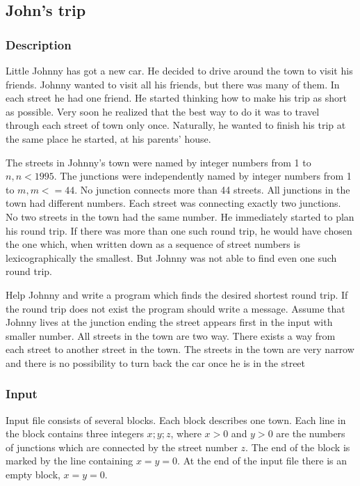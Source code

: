 \subsection{John's trip}


\subsubsection{Description}
Little Johnny has got a new car. He decided to drive around the town to visit his friends. Johnny wanted to visit all his friends, but there was many of them. In each street he had one friend. He started thinking how to make his trip as short as possible. Very soon he realized that the best way to do it was to travel through each street of town only once. Naturally, he wanted to finish his trip at the same place he started, at his parents' house. 

The streets in Johnny's town were named by integer numbers from 1 to $n, n < 1995$. The junctions were independently named by integer numbers from 1 to $m, m <= 44$. No junction connects more than 44 streets. All junctions in the town had different numbers. Each street was connecting exactly two junctions. No two streets in the town had the same number. He immediately started to plan his round trip. If there was more than one such round trip, he would have chosen the one which, when written down as a sequence of street numbers is lexicographically the smallest. But Johnny was not able to find even one such round trip. 

Help Johnny and write a program which finds the desired shortest round trip. If the round trip does not exist the program should write a message. Assume that Johnny lives at the junction ending the street appears first in the input with smaller number. All streets in the town are two way. There exists a way from each street to another street in the town. The streets in the town are very narrow and there is no possibility to turn back the car once he is in the street 


\subsubsection{Input}
Input file consists of several blocks. Each block describes one town. Each line in the block contains three integers $x; y; z$, where $x > 0$ and $y > 0$ are the numbers of junctions which are connected by the street number $z$. The end of the block is marked by the line containing $x = y = 0$. At the end of the input file there is an empty block, $x = y = 0$.


